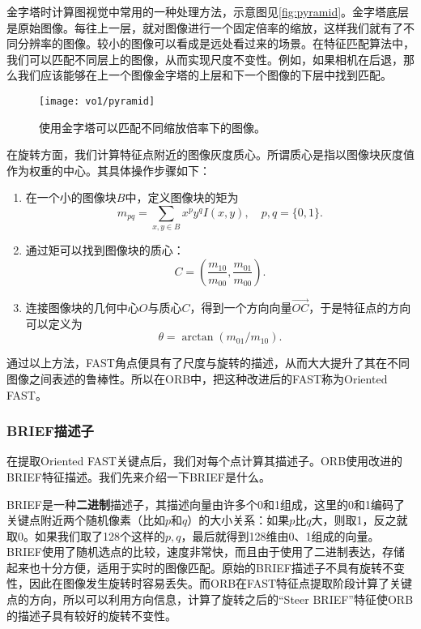 金字塔时计算图视觉中常用的一种处理方法，示意图见\autoref{fig:pyramid}。金字塔底层是原始图像。每往上一层，就对图像进行一个固定倍率的缩放，这样我们就有了不同分辨率的图像。较小的图像可以看成是远处看过来的场景。在特征匹配算法中，我们可以匹配不同层上的图像，从而实现尺度不变性。例如，如果相机在后退，那么我们应该能够在上一个图像金字塔的上层和下一个图像的下层中找到匹配。

\begin{figure}[!t]
    \centering
    \texttt{[image: vo1/pyramid]}\\
    \caption{使用金字塔可以匹配不同缩放倍率下的图像。}
    \label{fig:pyramid}
\end{figure}

在旋转方面，我们计算特征点附近的图像灰度质心。所谓质心是指以图像块灰度值作为权重的中心。其具体操作步骤如下\textsuperscript{\cite{Rosin1999}}：
\begin{enumerate}
\item 在一个小的图像块$B$中，定义图像块的矩为
\[
m_{pq}=\sum_{x,y \in B}x^{p}y^{q}I(x,y), \quad p, q = \{0,1\}.
\]
\item 通过矩可以找到图像块的质心：
\[
C=\left(\frac{m_{10}}{m_{00}},\frac{m_{01}}{m_{00}}\right).
\]
\item 连接图像块的几何中心$O$与质心$C$，得到一个方向向量$\overrightarrow{OC}$，于是特征点的方向可以定义为
\[
\theta = \arctan(m_{01}/m_{10}).
\]
\end{enumerate}
通过以上方法，FAST角点便具有了尺度与旋转的描述，从而大大提升了其在不同图像之间表述的鲁棒性。所以在ORB中，把这种改进后的FAST称为Oriented FAST。

\subsubsection{BRIEF描述子}
在提取Oriented FAST关键点后，我们对每个点计算其描述子。ORB使用改进的BRIEF特征描述。我们先来介绍一下BRIEF是什么。

BRIEF是一种\textbf{二进制}描述子，其描述向量由许多个0和1组成，这里的0和1编码了关键点附近两个随机像素（比如$p$和$q$）的大小关系：如果$p$比$q$大，则取1，反之就取0。如果我们取了128个这样的$p,q$，最后就得到128维由0、1组成的向量\textsuperscript{\cite{calonder2010brief}}。BRIEF使用了随机选点的比较，速度非常快，而且由于使用了二进制表达，存储起来也十分方便，适用于实时的图像匹配。原始的BRIEF描述子不具有旋转不变性，因此在图像发生旋转时容易丢失。而ORB在FAST特征点提取阶段计算了关键点的方向，所以可以利用方向信息，计算了旋转之后的“Steer BRIEF”特征使ORB的描述子具有较好的旋转不变性。

